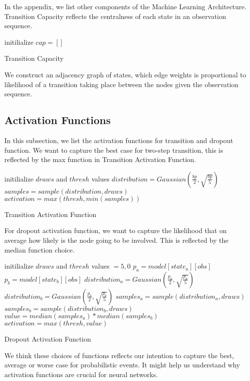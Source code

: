 \documentclass[10pt, conference, compsocconf]{IEEEtran}
\begin{document}
\appendix
In the appendix, we list other components of the Machine Learning Architecture. {\sc Transition Capacity} reflects the centralness of each state in an observation sequence. 
\begin{algorithm}[h]
initilialize $cap =[]$\;
\caption{{\sc Transition Capacity}}
\label{algo:transition_capacity}
\end{algorithm}
We construct an adjacency graph of states, which edge weights is proportional to likelihood of a transition taking place between the nodes given the observation sequence. 

\subsection{Activation Functions}
In this subsection, we list the activation functions for transition and dropout function. We want to capture the best case for two-step transition, this is reflected by the max function in {\sc Transition Activation Function}. 
\begin{algorithm}[h]
initilialize $draws$ and $thresh$ values \;
$distribution = Gaussian(\frac{bp}{2}, \sqrt{\frac{bp}{5}})$ \;
$samples = sample(distribution, draws)$ \;
$activation = max(thresh, min(samples))$ \;
\caption{{\sc Transition Activation Function}}
\label{algo:transition}
\end{algorithm}

For dropout activation function, we want to capture the likelihood that on average how likely is the node going to be involved. This is reflected by the median function choice. 
\begin{algorithm}[h]
initilialize $draws$ and $thresh$ values $=5, 0$\;
$p_a = model[state_a][obs]$ \;
$p_b = model[state_b][obs]$ \;
$distribution_a = Gaussian(\frac{p_a}{2}, \sqrt{\frac{p_a}{5}})$ \;
$distribution_b = Gaussian(\frac{p_b}{2}, \sqrt{\frac{p_b}{5}})$ \;
$samples_a = sample(distribution_a, draws)$ \;
$samples_b = sample(distribution_b, draws)$ \;
$value = median(samples_a)* median(samples_b)$ \;
$activation = max(thresh, value)$ \;
\caption{{\sc Dropout Activation Function}}
\label{algo:dropout}
\end{algorithm}
We think these choices of functions reflects our intention to capture the best, average or worse case for probabilistic events. It might help us understand why activation functions are crucial for neural networks.
\end{document}
